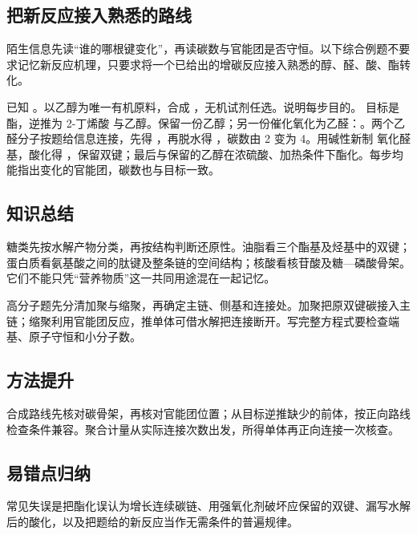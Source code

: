 \subsection{把新反应接入熟悉的路线}
陌生信息先读“谁的哪根键变化”，再读碳数与官能团是否守恒。以下综合例题不要求记忆新反应机理，只要求将一个已给出的增碳反应接入熟悉的醇、醛、酸、酯转化。

\begin{liti}[逐步搭建综合路线]
已知 。以乙醇为唯一有机原料，合成 ，无机试剂任选。说明每步目的。
\tcblower
\jie 目标是酯，逆推为 2-丁烯酸  与乙醇。保留一份乙醇；另一份催化氧化为乙醛：。两个乙醛分子按题给信息连接，先得 ，再脱水得 ，碳数由 2 变为 4。用碱性新制  氧化醛基，酸化得 ，保留双键；最后与保留的乙醇在浓硫酸、加热条件下酯化。每步均能指出变化的官能团，碳数也与目标一致。
\end{liti}

\subsection*{知识总结}
糖类先按水解产物分类，再按结构判断还原性。油脂看三个酯基及烃基中的双键；蛋白质看氨基酸之间的肽键及整条链的空间结构；核酸看核苷酸及糖—磷酸骨架。它们不能只凭“营养物质”这一共同用途混在一起记忆。

高分子题先分清加聚与缩聚，再确定主链、侧基和连接处。加聚把原双键碳接入主链；缩聚利用官能团反应，推单体可借水解把连接断开。写完整方程式要检查端基、原子守恒和小分子数。

\subsection*{方法提升}
合成路线先核对碳骨架，再核对官能团位置；从目标逆推缺少的前体，按正向路线检查条件兼容。聚合计量从实际连接次数出发，所得单体再正向连接一次核查。
\subsection*{易错点归纳}
常见失误是把酯化误认为增长连续碳链、用强氧化剂破坏应保留的双键、漏写水解后的酸化，以及把题给的新反应当作无需条件的普遍规律。

